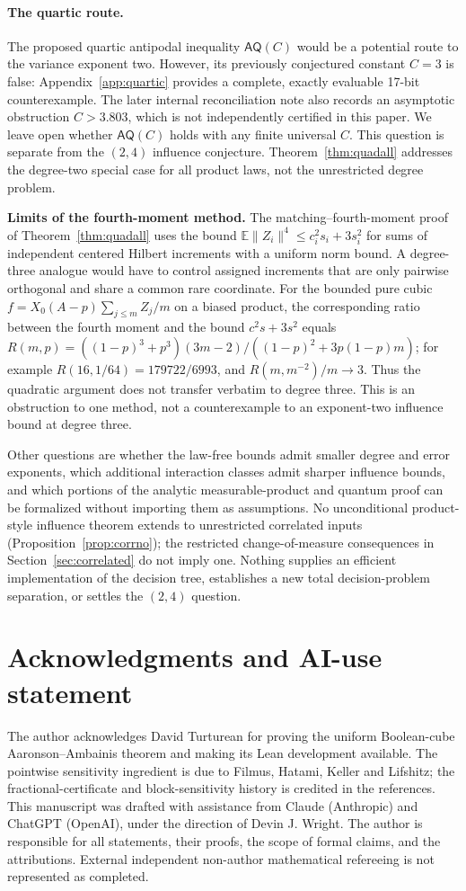 \documentclass[11pt]{article}
\numberwithin{equation}{section}
\theoremstyle{remark}
\newcommand{\E}{\mathbb E}
\begin{document}
\paragraph{The quartic route.}
The proposed quartic antipodal inequality $\mathsf{AQ}(C)$ would be a
potential route to the variance exponent two. However, its previously
conjectured constant $C=3$ is false: Appendix~\ref{app:quartic}
provides a complete, exactly evaluable 17-bit counterexample.
The later internal reconciliation note also records an asymptotic
obstruction $C>3.803$, which is not independently certified in this paper.
We leave open whether $\mathsf{AQ}(C)$ holds with any finite universal $C$.
This question is separate from the $(2,4)$ influence conjecture. Theorem~\ref{thm:quadall} addresses the degree-two special case for all product laws, not the unrestricted degree problem.\par\medskip\noindent\textbf{Limits of the fourth-moment method.} The matching--fourth-moment proof of Theorem~\ref{thm:quadall} uses the bound $\E\|Z_i\|^4\le c_i^2s_i+3s_i^2$ for sums of independent centered Hilbert increments with a uniform norm bound. A degree-three analogue would have to control assigned increments that are only pairwise orthogonal and share a common rare coordinate. For the bounded pure cubic $f=X_0(A-p)\sum_{j\le m}Z_j/m$ on a biased product, the corresponding ratio between the fourth moment and the bound $c^2s+3s^2$ equals $R(m,p)=((1-p)^3+p^3)(3m-2)/((1-p)^2+3p(1-p)m)$; for example $R(16,1/64)=179722/6993$, and $R(m,m^{-2})/m\to3$. Thus the quadratic argument does not transfer verbatim to degree three. This is an obstruction to one method, not a counterexample to an exponent-two influence bound at degree three.

Other questions are whether the law-free bounds admit smaller degree and error exponents, which additional interaction classes admit sharper influence bounds, and which portions of the analytic measurable-product and quantum proof can be formalized without importing them as assumptions. No unconditional product-style influence theorem extends to unrestricted correlated inputs (Proposition~\ref{prop:corrno}); the restricted change-of-measure consequences in Section~\ref{sec:correlated} do not imply one. Nothing supplies an efficient implementation of the decision tree, establishes a new total decision-problem separation, or settles the $(2,4)$ question.

\section*{Acknowledgments and AI-use statement}
The author acknowledges David Turturean for proving the uniform Boolean-cube Aaronson--Ambainis theorem and making its Lean development available. The pointwise sensitivity ingredient is due to Filmus, Hatami, Keller and Lifshitz; the fractional-certificate and block-sensitivity history is credited in the references. This manuscript was drafted with assistance from Claude (Anthropic) and ChatGPT (OpenAI), under the direction of Devin J. Wright. The author is responsible for all statements, their proofs, the scope of formal claims, and the attributions. External independent non-author mathematical refereeing is not represented as completed.
\end{document}
